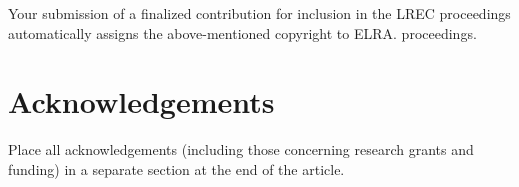 \documentclass[10pt, a4paper]{article}
\begin{document}
Your submission of a finalized contribution for inclusion in the LREC proceedings automatically assigns the above-mentioned copyright to ELRA.
proceedings.

\section{Acknowledgements}

Place all acknowledgements (including those concerning research grants and funding) in a separate section at the end of the article.




\end{document}
